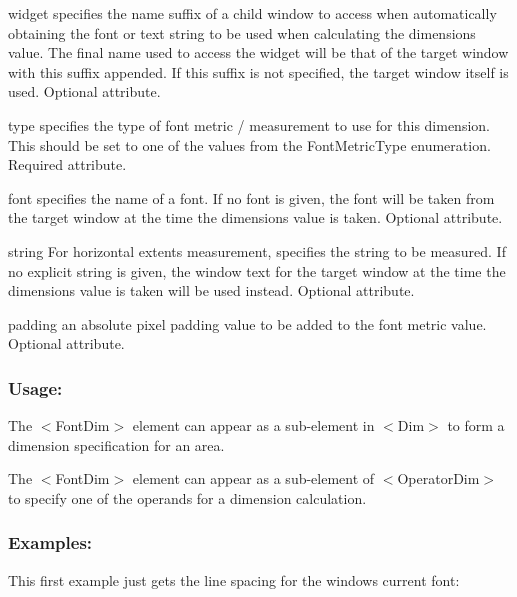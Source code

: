 \begin{DoxyItemize}
\item {\ttfamily widget} specifies the name suffix of a child window to access when automatically obtaining the font or text string to be used when calculating the dimension\textquotesingle{}s value. The final name used to access the widget will be that of the target window with this suffix appended. If this suffix is not specified, the target window itself is used. Optional attribute. \item {\ttfamily type} specifies the type of font metric / measurement to use for this dimension. This should be set to one of the values from the Font\+Metric\+Type enumeration. Required attribute. \item {\ttfamily font} specifies the name of a font. If no font is given, the font will be taken from the target window at the time the dimension\textquotesingle{}s value is taken. Optional attribute. \item {\ttfamily string} For horizontal extents measurement, specifies the string to be measured. If no explicit string is given, the window text for the target window at the time the dimension\textquotesingle{}s value is taken will be used instead. Optional attribute. \item {\ttfamily padding} an absolute pixel \textquotesingle{}padding\textquotesingle{} value to be added to the font metric value. Optional attribute.\end{DoxyItemize}
\hypertarget{fal_element_ref_fal_elem_ref_sec_12_3}{}\subsubsection{Usage\+:}\label{fal_element_ref_fal_elem_ref_sec_12_3}

\begin{DoxyItemize}
\item The {\ttfamily $<$Font\+Dim$>$} element can appear as a sub-\/element in {\ttfamily $<$Dim$>$} to form a dimension specification for an area. 
\item The {\ttfamily $<$Font\+Dim$>$} element can appear as a sub-\/element of {\ttfamily $<$Operator\+Dim$>$} to specify one of the operands for a dimension calculation. 
\end{DoxyItemize}\hypertarget{fal_element_ref_fal_elem_ref_sec_12_4}{}\subsubsection{Examples\+:}\label{fal_element_ref_fal_elem_ref_sec_12_4}
This first example just gets the line spacing for the window\textquotesingle{}s current font\+: 
\begin{DoxyCode}{0}
\end{DoxyCode}


